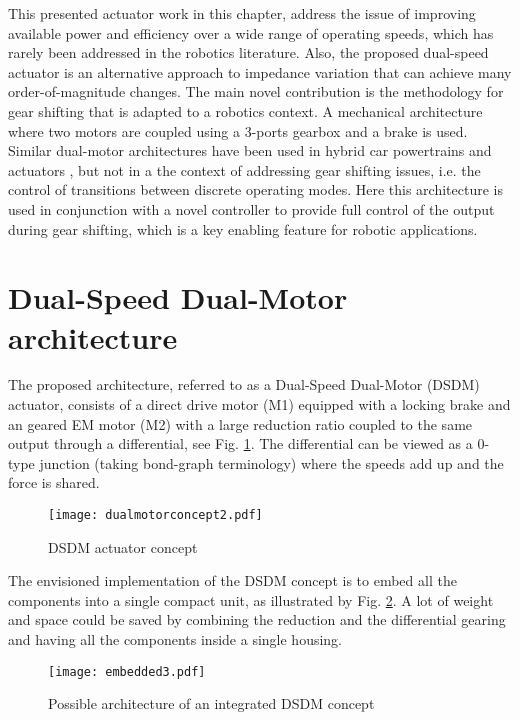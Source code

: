 This presented actuator work in this chapter, address the issue of improving available power and efficiency over a wide range of operating speeds, which has rarely been addressed in the robotics literature. Also, the proposed dual-speed actuator is an alternative approach to impedance variation that can achieve many order-of-magnitude changes. The main novel contribution is the methodology for gear shifting that is adapted to a robotics context. A mechanical architecture where two motors are coupled using a 3-ports gearbox and a brake is used. Similar dual-motor architectures have been used in hybrid car powertrains and actuators \cite{byeong-sang_kim_improved_2007}, but not in a the context of addressing gear shifting issues, i.e. the control of transitions between discrete operating modes. Here this architecture is used in conjunction with a novel controller to provide full control of the output during gear shifting, which is a key enabling feature for robotic applications.


\section{Dual-Speed Dual-Motor architecture}
\label{sec:DSDM}

The proposed architecture, referred to as a Dual-Speed Dual-Motor (DSDM) actuator, consists of a direct drive motor (M1) equipped with a locking brake and an geared EM motor (M2) with a large reduction ratio coupled to the same output through a differential, see Fig. \ref{fig:dualmotorconcept}. The differential can be viewed as a 0-type junction (taking bond-graph terminology) where the speeds add up and the force is shared. 


\begin{figure}[H]
	\centering
		\texttt{[image: dualmotorconcept2.pdf]}
	\caption{DSDM actuator concept}
	\label{fig:dualmotorconcept}
\end{figure}

The envisioned implementation of the DSDM concept is to embed all the components into a single compact unit, as illustrated by Fig. \ref{fig:embedded}. A lot of weight and space could be saved by combining the reduction and the differential gearing and having all the components inside a single housing. 


\begin{figure}[H]
	\centering
		\texttt{[image: embedded3.pdf]}
	\caption{Possible architecture of an integrated DSDM concept}
	\label{fig:embedded}
\end{figure}


